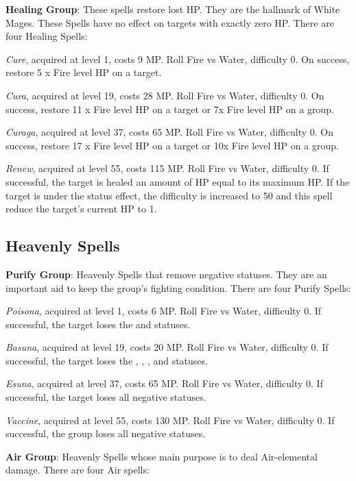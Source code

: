 \begin{multicols}{2}
	
    \textbf{Healing Group}: These spells restore lost HP. They are the hallmark of White Mages. These Spells have no effect on targets with exactly zero HP. There are four Healing Spells:

    \textit{Cure}, acquired at level 1, costs 9 MP. Roll Fire vs Water, difficulty 0. On success, restore 5 x Fire level HP on a target.

    \textit{Cura}, acquired at level 19, costs 28 MP. Roll Fire vs Water, difficulty 0. On success, restore 11 x Fire level HP on a target or 7x Fire level HP on a group.

    \textit{Curaga}, acquired at level 37, costs 65 MP. Roll Fire vs Water, difficulty 0. On success, restore 17 x Fire level HP on a target or 10x Fire level HP on a group.

    \textit{Renew}, acquired at level 55, costs 115 MP. Roll Fire vs Water, difficulty 0. If successful, the target is healed an amount of HP equal to its maximum HP. If the target is under the  status effect, the difficulty is increased to 50 and this spell reduce the target’s current HP to 1.

    \subsection{Heavenly Spells}

    \textbf{Purify Group}: Heavenly Spells that remove negative statuses. They are an important aid to keep the group’s fighting condition. There are four Purify Spells:

    \textit{Poisona}, acquired at level 1, costs 6 MP. Roll Fire vs Water, difficulty 0. If successful, the target loses the  and  statuses.

    \textit{Basuna}, acquired at level 19, costs 20 MP. Roll Fire vs Water, difficulty 0. If successful, the target loses the , , ,  and  statuses.

    \textit{Esuna}, acquired at level 37, costs 65 MP. Roll Fire vs Water, difficulty 0. If successful, the target loses all negative statuses.

    \textit{Vaccine}, acquired at level 55, costs 130 MP. Roll Fire vs Water, difficulty 0. If successful, the group loses all negative statuses.

    \textbf{Air Group}: Heavenly Spells whose main purpose is to deal Air-elemental damage. There are four Air spells:


\end{multicols}
